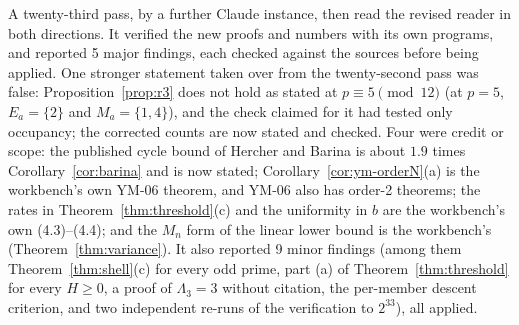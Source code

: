 A twenty-third pass, by a further Claude instance, then read the revised reader in both directions. It verified the new proofs and numbers with its own programs, and reported 5 major findings, each checked against the sources before being applied. One stronger statement taken over from the twenty-second pass was false: Proposition~\ref{prop:r3} does not hold as stated at $p\equiv5\pmod{12}$ (at $p=5$, $E_a=\{2\}$ and $M_a=\{1,4\}$), and the check claimed for it had tested only occupancy; the corrected counts are now stated and checked. Four were credit or scope: the published cycle bound of Hercher and Barina is about $1.9$ times Corollary~\ref{cor:barina} and is now stated; Corollary~\ref{cor:ym-orderN}(a) is the workbench's own YM-06 theorem, and YM-06 also has order-2 theorems; the rates in Theorem~\ref{thm:threshold}(c) and the uniformity in $b$ are the workbench's own (4.3)--(4.4); and the $M_n$ form of the linear lower bound is the workbench's (Theorem~\ref{thm:variance}). It also reported 9 minor findings (among them Theorem~\ref{thm:shell}(c) for every odd prime, part (a) of Theorem~\ref{thm:threshold} for every $H\ge0$, a proof of $\Lambda_3=3$ without citation, the per-member descent criterion, and two independent re-runs of the verification to $2^{33}$), all applied.

